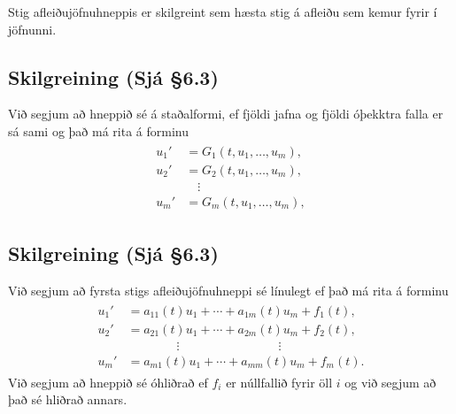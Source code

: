 \documentclass[a4paper,10pt,icelandic]{sphinxmanual}
\begin{document}
Stig afleiðujöfnuhneppis er skilgreint sem hæsta stig á afleiðu sem
kemur fyrir í jöfnunni.


\subsection{Skilgreining (Sjá \S{}6.3)}
\label{\detokenize{Kafli06:id3}}
Við segjum að hneppið sé á staðalformi, ef fjöldi jafna og fjöldi óþekktra falla er sá sami og það má rita á forminu
\begin{equation*}
\begin{split}\begin{aligned}
u_1'&= G_1(t, u_1,\dots, u_m),\\
u_2'&= G_2(t, u_1,\dots, u_m),\\
&\quad \vdots\\
u_m'&= G_m(t, u_1,\dots, u_m),\end{aligned}\end{split}
\end{equation*}

\subsection{Skilgreining (Sjá \S{}6.3)}
\label{\detokenize{Kafli06:id4}}
Við segjum að fyrsta stigs afleiðujöfnuhneppi sé línulegt ef það má rita á forminu
\begin{equation*}
\begin{split}\begin{aligned}
u_1'&=a_{11}(t)u_1+\cdots+a_{1m}(t)u_m+f_1(t),\\
u_2'&=a_{21}(t)u_1+\cdots+a_{2m}(t)u_m+f_2(t),\\
&\qquad \qquad \vdots\qquad \qquad \qquad \qquad \vdots\\
u_m'&=a_{m1}(t)u_1+\cdots+a_{mm}(t)u_m+f_m(t).\end{aligned}\end{split}
\end{equation*}
Við segjum að hneppið sé óhliðrað ef \(f_i\) er núllfallið fyrir öll \(i\) og við segjum að það sé hliðrað annars.
\end{document}
